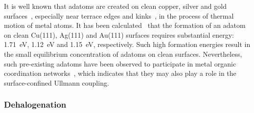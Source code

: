 \documentclass[%
 reprint,
 amsmath,amssymb,
 aps,
prb,
floatfix,
]{revtex4-2}
\newcommand{\comm}{\color{ForestGreen}} %
\begin{document}
{%

It is well known that adatoms are created on clean copper, silver and gold surfaces~\cite{ullmann_79, ullmann_58}, especially near terrace edges and kinks~\cite{ullmann_84, ullmann_85}, in the process of thermal motion of metal atoms. 
It has been calculated~\cite{chemeurope2017} that the formation of an adatom on clean Cu(111), Ag(111) and Au(111) surfaces requires substantial energy: \SI{1.71}{\electronvolt}, \SI{1.12}{\electronvolt} and \SI{1.15}{\electronvolt}, respectively. Such high formation energies result in the small equilibrium concentration of adatoms on clean surfaces.  
Nevertheless, such pre-existing adatoms have been observed to participate in metal organic coordination networks~\cite{ullmann_80, ullmann_81, ullmann_82, ullmann_83}, which indicates that they may also play a role in the surface-confined Ullmann coupling.


}

\ifdefined\INTERNAL

\subsubsection{Dehalogenation}
\end{document}
